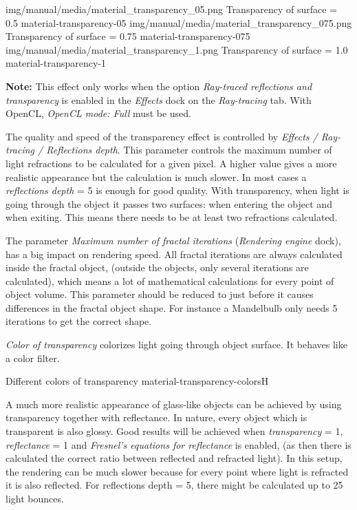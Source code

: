 \threeImagesWithTwoCaptionsFullWidth
{img/manual/media/material_transparency_05.png}
{Transparency of surface = 0.5}
{material-transparency-05}
{img/manual/media/material_transparency_075.png}
{Transparency of surface = 0.75}
{material-transparency-075}
{img/manual/media/material_transparency_1.png}
{Transparency of surface = 1.0}
{material-transparency-1}

\textbf{Note: }This effect only works when the option \emph{Ray-traced reflections and transparency} is enabled in the \emph{Effects} dock on the \emph{Ray-tracing} tab. With OpenCL, \emph{OpenCL mode: Full} must be used.

The quality and speed of the transparency effect is controlled by \emph{Effects / Ray-tracing / Reflections depth}. This parameter controls the maximum number of light refractions to be calculated for a given pixel. A higher value gives a more realistic appearance but the calculation is much slower. In most cases a \emph{reflections depth} = 5 is enough for good quality. With transparency, when light is going through the object it passes two surfaces: when entering the object and when exiting. This means there needs to be at least two refractions calculated.

The parameter \emph{Maximum number of fractal iterations} (\emph{Rendering engine} dock), has a big impact on rendering speed. All fractal iterations are always calculated inside the fractal object, (outside the objects, only several iterations are calculated), which means a lot of mathematical calculations for every point of object volume. This parameter should be reduced to just before it causes differences in the fractal object shape. For instance a Mandelbulb only needs 5 iterations to get the correct shape. 

\emph{Color of transparency} colorizes light going through object surface. It behaves like a color filter.

{Different colors of transparency}
{material-transparency-colors}{H}

A much more realistic appearance of glass-like objects can be achieved by using transparency together with reflectance. In nature, every object which is transparent is also glossy. Good results will be achieved when \emph{transparency} = 1, \emph{reflectance} = 1 and \emph{Fresnel's equations for reflectance} is enabled, (as then there is calculated the correct ratio between reflected and refracted light). In this setup, the rendering can be much slower because for every point where light is refracted it is also reflected. For reflections depth = 5, there might be calculated up to 25 light bounces. 

